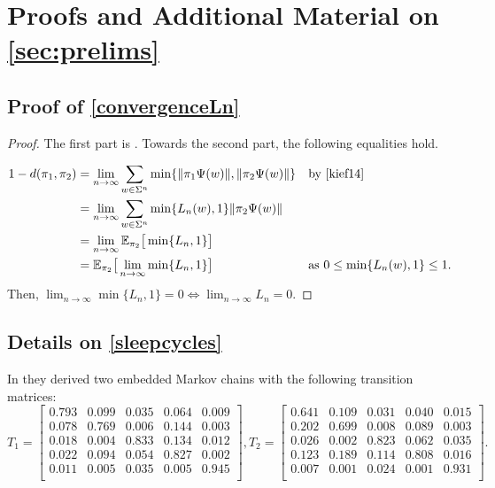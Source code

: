 \documentclass[a4paper,UKenglish,cleveref, autoref,mathscr]{lipics-v2019}
\newcommand{\EE}{\mathbb{E}}
\newcommand{\1}{\mathbbm{1}}
\newcommand{\stefan}[1]{\marginpar{\textcolor{blue}{#1}}}
\renewcommand{\stefan}[1]{}
\begin{document}


\appendix

\section{Proofs and Additional Material on \cref{sec:prelims}} \label{app:prelims}

\subsection{Proof of \cref{convergenceLn}}

\convergenceLn*

\begin{proof}
The first part is \cite[Proposition~6]{kief14}.
Towards the second part, the following equalities hold.
\stefan{Define notation $\land$}
\begin{align*}
1 - d(\pi_1, \pi_2) & = \lim_{n \rightarrow \infty} \sum_{w \in \Sigma^n} \min\{\| \pi_1 \Psi(w) \|, \| \pi_2 \Psi(w) \|\} && \text{by \cite[Theorem~ 7]{kief14}}\\
& = \lim_{n \rightarrow \infty} \sum_{w \in \Sigma^n} \min\{L_n(w), 1 \}\| \pi_2 \Psi(w)\| \\
& = \lim_{n \rightarrow \infty} \EE_{\pi_2}\big[\min\{ L_n, 1\}  \big] \\
& = \EE_{\pi_2} \big[ \lim_{n \rightarrow \infty}  \min\{L_n, 1\}  \big] && \text{as } 0 \leq \min\{L_n(w), 1\} \leq 1.
\end{align*}
Then, $\lim_{n \rightarrow \infty}  \min\{L_n, 1\} = 0 \iff \lim_{n \rightarrow \infty}  L_n = 0$.
\end{proof}

\subsection{Details on \cref{sleepcycles}} \label{app:sleepcycles}

In \cite{rockhart13} they derived two embedded Markov chains with the following transition matrices:
\begin{equation*}T_1 = \begin{bmatrix}
0.793 & 0.099 & 0.035 & 0.064 &	0.009 \\
0.078 & 0.769 & 0.006 & 0.144 & 0.003 \\
0.018 & 0.004 & 0.833 & 0.134 & 0.012  \\
0.022 & 0.094 & 0.054 & 0.827 & 0.002 \\
0.011 & 0.005 & 0.035 & 0.005 & 0.945  \\
\end{bmatrix}, T_2 = \begin{bmatrix}
0.641 & 0.109 & 0.031 & 0.040 & 0.015 \\
0.202 & 0.699 & 0.008 & 0.089 & 0.003 \\
0.026 & 0.002 & 0.823 & 0.062 & 0.035 \\
0.123 & 0.189 & 0.114 & 0.808 & 0.016 \\
0.007 & 0.001 & 0.024 & 0.001 & 0.931 \\
\end{bmatrix}.
\end{equation*}
\end{document}
